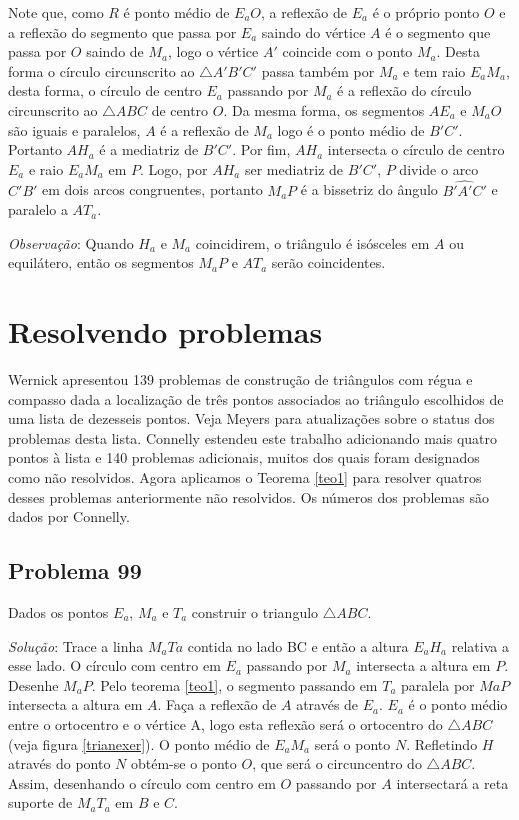 \documentclass[12pt, openright, a4paper, brazil, openany, oneside]{abntex2}
\begin{document}
Note que, como $R$ é ponto médio de $E_{a}O$, a reflexão de $E_a$ é o próprio ponto $O$ e a reflexão do segmento que passa por $E_a$ saindo do vértice $A$ é o segmento que passa por $O$ saindo de $M_a$, logo o vértice $A'$ coincide com o ponto $M_a$. Desta forma o círculo circunscrito ao $\triangle A'B'C'$ passa também por $M_a$ e tem raio $E_{a}M_{a}$, desta forma, o círculo de centro $E_a$ passando por $M_a$ é a reflexão do círculo circunscrito ao $\triangle ABC$ de centro $O$. Da mesma forma, os segmentos $AE_a$ e $M_{a}O$ são iguais e paralelos, $A$ é a reflexão de $M_a$ logo é o ponto médio de $B'C'$. Portanto $AH_a$ é a mediatriz de $B'C'$. Por fim, $AH_a$ intersecta o círculo de centro $E_a$ e raio $E_{a}M_a$ em $P$. Logo, por $AH_a$ ser mediatriz de $B'C'$, $P$ divide o arco $C'B'$ em dois arcos congruentes, portanto $M_aP$ é a bissetriz do ângulo $\hat{B'A'C'}$ e paralelo a $AT_a$.

\textit{Observação}: Quando $H_a$ e $M_a$ coincidirem, o triângulo é isósceles em $A$ ou equilátero, então os segmentos $M_{a}P$ e $AT_a$ serão coincidentes.

\chapter{Resolvendo problemas}

Wernick\cite{Wernick} apresentou 139 problemas de construção de triângulos com régua e compasso dada a localização de três pontos associados ao triângulo escolhidos de uma lista de dezesseis pontos. Veja Meyers\cite{Meyers} para atualizações sobre o status dos problemas desta lista. Connelly \cite{con} estendeu este trabalho adicionando mais quatro pontos à lista e 140 problemas adicionais, muitos dos quais foram designados como não resolvidos. Agora aplicamos o Teorema \ref{teo1} para resolver quatros desses problemas anteriormente não resolvidos. Os números dos problemas são dados por Connelly.

\section{Problema 99}

Dados os pontos $E_a$, $M_a$ e $T_a$ construir o triangulo $\triangle ABC$.

\textit{Solução}: Trace a linha $M_{a}T{a}$ contida no lado BC e então a altura $E_{a}H_{a}$ relativa a esse lado. O círculo com centro em $E_{a}$ passando por $M_{a}$ intersecta a altura em $P$. Desenhe $M_{a}P$. Pelo teorema \ref{teo1}, o segmento passando em $T_{a}$ paralela por $M{a}P$ intersecta a altura em $A$. Faça a reflexão de $A$ através de $E_{a}$. $E_{a}$ é o ponto médio entre o ortocentro e o vértice A, logo esta reflexão será o ortocentro do $\triangle ABC$ (veja figura \ref{trianexer}). O ponto médio de $E_{a}M_{a}$ será o ponto $N$. Refletindo $H$ através do ponto $N$ obtém-se o ponto $O$, que será o circuncentro do $\triangle ABC$. Assim, desenhando o círculo com centro em $O$ passando por $A$ intersectará a reta suporte de $M_{a}T_{a}$ em $B$ e $C$. 
\end{document}
